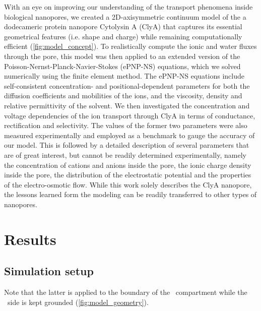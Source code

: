 \documentclass[journal=ancac3,manuscript=article,etalmode=truncate,maxauthors=0,layout=twocolumn]{achemso}
\begin{document}
With an eye on improving our understanding of the transport phenomena inside biological nanopores, we created 
a 2D-axisymmetric continuum model of the a dodecameric protein nanopore Cytolysin A (ClyA)\cite{Soskine-2013} 
that captures its essential geometrical features (i.e. shape and charge) while remaining computationally 
efficient (\cref{fig:model_concept}). To realistically compute the ionic and water fluxes through the pore, 
this model was then applied to an extended version of the Poisson-Nernst-Planck-Navier-Stokes (ePNP-NS) 
equations, which we solved numerically using the finite element method. The ePNP-NS equations include 
self-consistent concentration- and positional-dependent parameters for both the diffusion coefficients and 
mobilities of the ions, and the viscosity, density and relative permittivity of the solvent. We then 
investigated the concentration and voltage dependencies of the ion transport through ClyA in terms of 
conductance, rectification and selectivity. The values of the former two parameters were also measured 
experimentally and employed as a benchmark to gauge the accuracy of our model. This is followed by a detailed 
description of several parameters that are of great interest, but cannot be readily determined 
experimentally, namely the concentration of cations and anions inside the pore, the ionic charge density 
inside the pore, the distribution of the electrostatic potential and the properties of the electro-osmotic 
flow. While this work solely describes the ClyA nanopore, the lessons learned form the modeling can be 
readily transferred to other types of nanopores.

\section{Results}\label{sect:results}

\subsection{Simulation setup}
Note that the latter is applied to the boundary of the \trans\ compartment while 
the \cis\ side is kept grounded (\cref{fig:model_geometry}).


\end{document}

